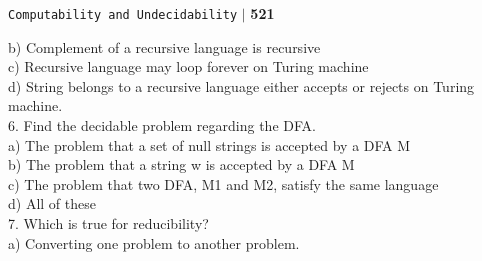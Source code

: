 \documentclass[11pt]{article}
\begin{document}
\begin{flushright}
 \texttt{Computability and Undecidability} \hspace*{0.1cm}\textbf{$|$} \hspace*{0.1cm} \textbf{521}\hspace*{0.1cm}
\end{flushright}
\vspace*{0.5cm}

\begin{multicols}{2}

\hspace*{0.5cm}
b) Complement of a recursive language is
recursive\\

\vspace*{0.1cm}
\hspace*{0.5cm}
c) Recursive language may loop forever
on Turing machine\\

\vspace*{0.1cm}
\hspace*{0.5cm}
d) String belongs to a recursive language
either accepts or rejects on Turing
machine.\\

\vspace*{0.2cm}
6. Find the decidable problem regarding the
DFA.\\

\vspace*{0.1cm}
\hspace*{0.5cm} a) The problem that a set of null strings is
accepted by a DFA M\\

\vspace*{0.1cm}
\hspace*{0.5cm} b) The problem that a string w is accepted
by a DFA M\\

\vspace*{0.1cm}
\hspace*{0.5cm} c) The problem that two DFA, M1 and M2,
satisfy the same language\\

\vspace*{0.1cm}
\hspace*{0.5cm} d) All of these\\


7. Which is true for reducibility?\\

\vspace*{0.1cm}
\hspace*{0.5cm} a) Converting one problem to another
problem.\\


\end{multicols}
\end{document}
